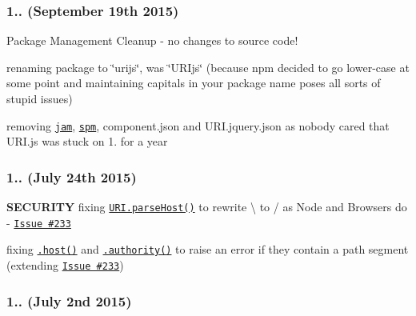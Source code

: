 \subsubsection*{1.. (September 19th 2015)}

Package Management Cleanup -\/ no changes to source code!


\begin{DoxyItemize}
\item renaming package to \char`\"{}urijs\char`\"{}, was \char`\"{}\+U\+R\+Ijs\char`\"{} (because npm decided to go lower-\/case at some point and maintaining capitals in your package name poses all sorts of stupid issues)
\item removing \href{http://jamjs.org/}{\tt jam}, \href{http://spmjs.org/}{\tt spm}, {\ttfamily component.\+json} and {\ttfamily U\+R\+I.\+jquery.\+json} as nobody cared that U\+R\+I.\+js was stuck on 1. for a year
\end{DoxyItemize}

\subsubsection*{1.. (July 24th 2015)}


\begin{DoxyItemize}
\item {\bfseries S\+E\+C\+U\+R\+I\+TY} fixing \href{http://medialize.github.io/URI.js/docs.html#static-parseHost}{\tt {\ttfamily U\+R\+I.\+parse\+Host()}} to rewrite {\ttfamily \textbackslash{}} to {\ttfamily /} as Node and Browsers do -\/ \href{https://github.com/medialize/URI.js/pull/233}{\tt Issue \#233}
\item fixing \href{http://medialize.github.io/URI.js/docs.html#accessors-host}{\tt {\ttfamily .host()}} and \href{http://medialize.github.io/URI.js/docs.html#accessors-authority}{\tt {\ttfamily .authority()}} to raise an error if they contain a path segment (extending \href{https://github.com/medialize/URI.js/pull/233}{\tt Issue \#233})
\end{DoxyItemize}

\subsubsection*{1.. (July 2nd 2015)}


